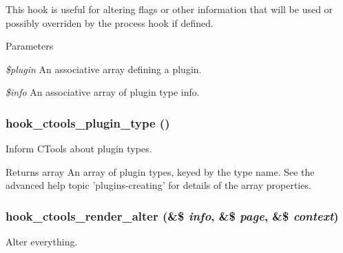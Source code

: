 This hook is useful for altering flags or other information that will be used or possibly overriden by the process hook if defined.


\begin{DoxyParams}{Parameters}
\item[{\em \$plugin}]An associative array defining a plugin. \item[{\em \$info}]An associative array of plugin type info. \end{DoxyParams}
\hypertarget{group__hooks_gacb27d27849a3374ddda0120603d549ac}{
\subsubsection[{hook\_\-ctools\_\-plugin\_\-type}]{\setlength{\rightskip}{0pt plus 5cm}hook\_\-ctools\_\-plugin\_\-type ()}}
\label{group__hooks_gacb27d27849a3374ddda0120603d549ac}
Inform CTools about plugin types.

\begin{DoxyReturn}{Returns}
array An array of plugin types, keyed by the type name. See the advanced help topic 'plugins-\/creating' for details of the array properties. 
\end{DoxyReturn}
\hypertarget{group__hooks_ga512e53c159fc6ea771d23b52d54b2f6a}{
\subsubsection[{hook\_\-ctools\_\-render\_\-alter}]{\setlength{\rightskip}{0pt plus 5cm}hook\_\-ctools\_\-render\_\-alter (\&\$ {\em info}, \/  \&\$ {\em page}, \/  \&\$ {\em context})}}
\label{group__hooks_ga512e53c159fc6ea771d23b52d54b2f6a}
Alter everything.


